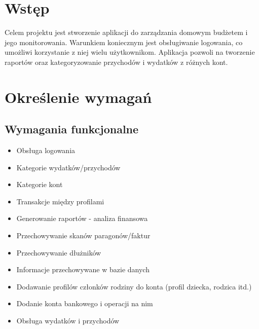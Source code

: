 \documentclass[12pt,a4paper,oneside]{article}
\begin{document}
\thispagestyle{empty}
\tableofcontents
\newpage

\section{Wstęp}
Celem projektu jest stworzenie aplikacji do zarządzania domowym budżetem i jego
monitorowania. Warunkiem koniecznym jest obsługiwanie logowania, co umożliwi
korzystanie z niej wielu użytkownikom. Aplikacja pozwoli na tworzenie raportów
oraz kategoryzowanie przychodów i wydatków z różnych kont.

\section{Określenie wymagań}
\subsection{Wymagania funkcjonalne}
\begin{itemize}
    \item Obsługa logowania
    \item Kategorie wydatków/przychodów
    \item Kategorie kont
    \item Transakcje między profilami
    \item Generowanie raportów - analiza finansowa
    \item Przechowywanie skanów paragonów/faktur
    \item Przechowywanie dłużników
    \item Informacje przechowywane w bazie danych
    \item Dodawanie profilów członków rodziny do konta (profil dziecka, rodzica
          itd.)
    \item Dodanie konta bankowego i operacji na nim
    \item Obsługa wydatków i przychodów
\end{itemize}
\end{document}
